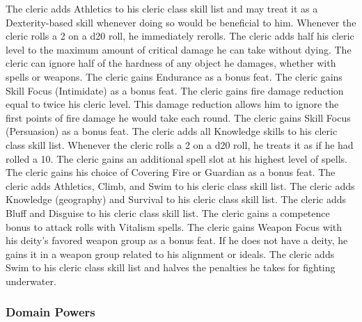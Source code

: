  The cleric adds Athletics to his cleric class skill list and may treat it as a Dexterity-based skill whenever doing so would be beneficial to him.
 Whenever the cleric rolls a 2 on a d20 roll, he immediately rerolls.
 The cleric adds half his cleric level to the maximum amount of critical damage he can take without dying.
 The cleric can ignore half of the hardness of any object he damages, whether with spells or weapons.
 The cleric gains Endurance as a bonus feat.
 The cleric gains Skill Focus (Intimidate) as a bonus feat.
 The cleric gains fire damage reduction equal to twice his cleric level. This damage reduction allows him to ignore the first points of fire damage he would take each round.
 The cleric gains Skill Focus (Persuasion) as a bonus feat.
 The cleric adds all Knowledge skills to his cleric class skill list.
 Whenever the cleric rolls a 2 on a d20 roll, he treats it as if he had rolled a 10.
 The cleric gains an additional spell slot at his highest level of spells.
 The cleric gains his choice of Covering Fire or Guardian as a bonus feat.
 The cleric adds Athletics, Climb, and Swim to his cleric class skill list.
 The cleric adds Knowledge (geography) and Survival to his cleric class skill list.
 The cleric adds Bluff and Disguise to his cleric class skill list.
 The cleric gains a  competence bonus to attack rolls with Vitalism spells.
 The cleric gains Weapon Focus with his deity's favored weapon group as a bonus feat. If he does not have a deity, he gains it in a weapon group related to his alignment or ideals.
 The cleric adds Swim to his cleric class skill list and halves the penalties he takes for fighting underwater.

\subsubsection{Domain Powers}\label{Domain Powers}

